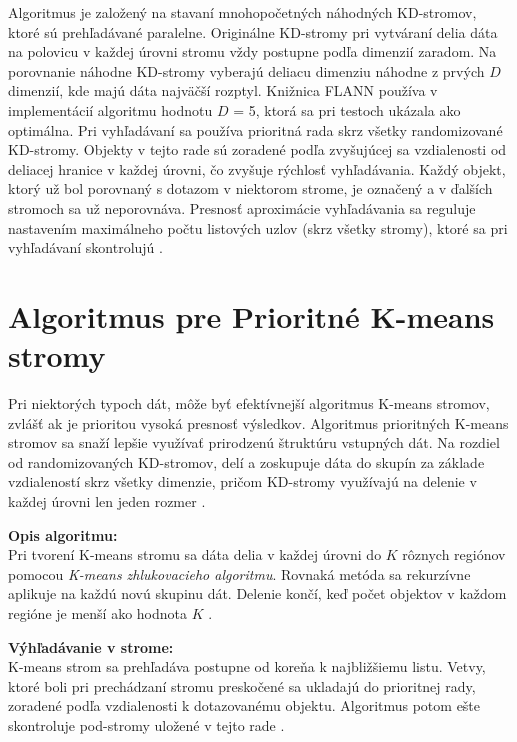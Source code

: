 \documentclass[12pt,a4paper,oneside]{fithesis2}
\begin{document}
	Algoritmus je založený na stavaní mnohopočetných náhodných KD-stromov, ktoré sú prehľadávané paralelne. Originálne KD-stromy pri vytváraní delia dáta na polovicu v každej úrovni stromu vždy postupne podľa dimenzií zaradom. Na porovnanie náhodne KD-stromy vyberajú deliacu dimenziu náhodne z prvých $D$ dimenzií, kde majú dáta najväčší rozptyl. Knižnica FLANN používa v implementácií algoritmu hodnotu $D$ = 5, ktorá sa pri testoch ukázala ako optimálna. Pri vyhľadávaní sa používa prioritná rada skrz všetky randomizované KD-stromy. Objekty v tejto rade sú zoradené podľa zvyšujúcej sa vzdialenosti od deliacej hranice v každej úrovni, čo zvyšuje rýchlosť vyhľadávania. Každý objekt, ktorý už bol porovnaný s dotazom v niektorom strome, je označený a v ďalších  stromoch sa už neporovnáva. Presnosť aproximácie vyhľadávania sa reguluje nastavením maximálneho počtu listových uzlov (skrz všetky stromy), ktoré sa pri vyhľadávaní skontrolujú \cite{flann_pami_2014}.	
	
	\section{Algoritmus pre Prioritné K-means stromy}
	Pri niektorých typoch dát, môže byť efektívnejší algoritmus K-means stromov, zvlášť ak je prioritou vysoká presnosť výsledkov. Algoritmus prioritných K-means stromov sa snaží lepšie využívať prirodzenú štruktúru vstupných dát. Na rozdiel od randomizovaných KD-stromov, delí a zoskupuje dáta do skupín za základe vzdialeností skrz všetky dimenzie, pričom KD-stromy využívajú na delenie v každej úrovni len jeden rozmer \cite{flann_pami_2014}.
	
	\textbf{Opis algoritmu:}\\
	Pri tvorení K-means stromu sa dáta delia v každej úrovni do $K$ rôznych regiónov pomocou \textit{K-means zhlukovacieho algoritmu}. Rovnaká metóda sa rekurzívne aplikuje na každú novú skupinu dát. Delenie končí, keď počet objektov v každom regióne je menší ako hodnota $K$ \cite{flann_pami_2014}. %
	
	\textbf{Výhľadávanie v strome:}\\
	K-means strom sa prehľadáva postupne od koreňa k najbližšiemu listu. Vetvy, ktoré boli pri prechádzaní stromu preskočené sa ukladajú do prioritnej rady, zoradené podľa vzdialenosti k dotazovanému objektu. Algoritmus potom ešte skontroluje pod-stromy uložené v tejto rade \cite{flann_pami_2014}. %
	
\end{document}
